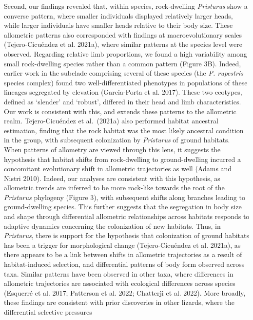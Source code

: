 \documentclass[
  11pt,
]{article}
\begin{document}
Second, our findings revealed that, within species, rock-dwelling
\emph{Pristurus} show a converse pattern, where smaller individuals
displayed relatively larger heads, while larger individuals have smaller
heads relative to their body size. These allometric patterns also
corresponded with findings at macroevolutionary scales (Tejero-Cicuéndez
et al. 2021a), where similar patterns at the species level were
observed. Regarding relative limb proportions, we found a high
variability among small rock-dwelling species rather than a common
pattern (Figure 3B). Indeed, earlier work in the subclade comprising
several of these species (the \emph{P. rupestris} species complex) found
two well-differentiated phenotypes in populations of these lineages
segregated by elevation (Garcia-Porta et al. 2017). These two ecotypes,
defined as `slender' and `robust', differed in their head and limb
characteristics. Our work is consistent with this, and extends these
patterns to the allometric realm. Tejero-Cicuéndez et al.~(2021a) also
performed habitat ancestral estimation, finding that the rock habitat
was the most likely ancestral condition in the group, with subsequent
colonization by \emph{Pristurus} of ground habitats. When patterns of
allometry are viewed through this lens, it suggests the hypothesis that
habitat shifts from rock-dwelling to ground-dwelling incurred a
concomitant evolutionary shift in allometric trajectories as well (Adams
and Nistri 2010). Indeed, our analyses are consistent with this
hypothesis, as allometric trends are inferred to be more rock-like
towards the root of the \emph{Pristurus} phylogeny (Figure 3), with
subsequent shifts along branches leading to ground-dwelling species.
This further suggests that the segregation in body size and shape
through differential allometric relationships across habitats responds
to adaptive dynamics concerning the colonization of new habitats. Thus,
in \emph{Pristurus}, there is support for the hypothesis that
colonization of ground habitats has been a trigger for morphological
change (Tejero-Cicuéndez et al. 2021a), as there appears to be a link
between shifts in allometric trajectories as a result of habitat-induced
selection, and differential patterns of body form observed across taxa.
Similar patterns have been observed in other taxa, where differences in
allometric trajectories are associated with ecological differences
across species (Esquerré et al. 2017; Patterson et al. 2022; Chatterji
et al. 2022). More broadly, these findings are consistent with prior
discoveries in other lizards, where the differential selective pressures
\end{document}
